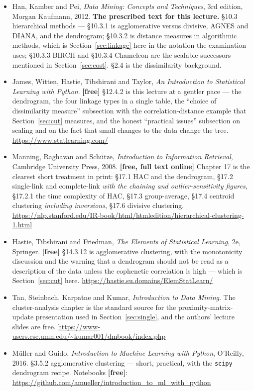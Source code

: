 \documentclass[11pt]{article}
\begin{document}
\begin{itemize}[leftmargin=*]
  \item Han, Kamber and Pei, \emph{Data Mining: Concepts and Techniques}, 3rd
    edition, Morgan Kaufmann, 2012. \textbf{The prescribed text for this
    lecture.} \S10.3 hierarchical methods --- \S10.3.1 is agglomerative
    versus divisive, AGNES and DIANA, and the dendrogram; \S10.3.2 is distance
    measures in algorithmic methods, which is Section~\ref{sec:linkage} here
    in the notation the examination uses; \S10.3.3 BIRCH and \S10.3.4
    Chameleon are the scalable successors mentioned in
    Section~\ref{sec:cost}. \S2.4 is the dissimilarity background.
  \item James, Witten, Hastie, Tibshirani and Taylor, \emph{An Introduction to
    Statistical Learning with Python}. \textbf{[free]} \S12.4.2 is this
    lecture at a gentler pace --- the dendrogram, the four linkage types in a
    single table, the ``choice of dissimilarity measure'' subsection with the
    correlation-distance example that Section~\ref{sec:cut} measures, and the
    honest ``practical issues'' subsection on scaling and on the fact that
    small changes to the data change the tree.
    \url{https://www.statlearning.com/}
  \item Manning, Raghavan and Sch\"utze, \emph{Introduction to Information
    Retrieval}, Cambridge University Press, 2008. \textbf{[free, full text
    online]} Chapter 17 is the clearest short treatment in print: \S17.1 HAC
    and the dendrogram, \S17.2 single-link and complete-link \emph{with the
    chaining and outlier-sensitivity figures}, \S17.2.1 the time complexity
    of HAC, \S17.3 group-average, \S17.4 centroid clustering \emph{including
    inversions}, \S17.6 divisive clustering.
    \url{https://nlp.stanford.edu/IR-book/html/htmledition/hierarchical-clustering-1.html}
  \item Hastie, Tibshirani and Friedman, \emph{The Elements of Statistical
    Learning}, 2e, Springer. \textbf{[free]} \S14.3.12 is agglomerative
    clustering, with the monotonicity discussion and the warning that a
    dendrogram should not be read as a description of the data unless the
    cophenetic correlation is high --- which is Section~\ref{sec:cut} here.
    \url{https://hastie.su.domains/ElemStatLearn/}
  \item Tan, Steinbach, Karpatne and Kumar, \emph{Introduction to Data
    Mining}. The cluster-analysis chapter is the standard source for the
    proximity-matrix-update presentation used in Section~\ref{sec:single}, and
    the authors' lecture slides are free.
    \url{https://www-users.cse.umn.edu/~kumar001/dmbook/index.php}
  \item M\"uller and Guido, \emph{Introduction to Machine Learning with
    Python}, O'Reilly, 2016. \S3.5.2 agglomerative clustering --- short,
    practical, with the \texttt{scipy} dendrogram recipe. Notebooks
    \textbf{[free]}:
    \url{https://github.com/amueller/introduction_to_ml_with_python}
\end{itemize}
\end{document}
